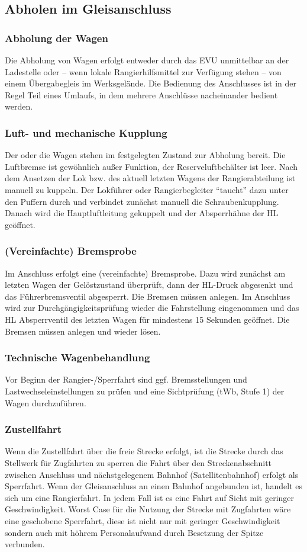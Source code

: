 \subsection{Abholen im Gleisanschluss}
\subsubsection{Abholung der Wagen}
Die Abholung von Wagen erfolgt entweder durch das EVU unmittelbar an der Ladestelle oder -- wenn lokale Rangierhilfsmittel zur Verfügung stehen -- von einem Übergabegleis im Werksgelände. Die Bedienung des Anschlusses ist in der Regel Teil eines Umlaufs, in dem mehrere Anschlüsse nacheinander bedient werden.
\subsubsection{Luft- und mechanische Kupplung}\label{sec:LuftumechKup}
Der oder die Wagen stehen im festgelegten Zustand zur Abholung bereit. Die Luftbremse ist gewöhnlich außer Funktion, der Reserveluftbehälter ist leer. Nach dem Ansetzen der Lok bzw. des aktuell letzten Wagens der Rangierabteilung ist manuell zu kuppeln. Der Lokführer oder Rangierbegleiter "`taucht"' dazu unter den Puffern durch und verbindet zunächst manuell die Schraubenkupplung. Danach wird die Hauptluftleitung gekuppelt und der Absperrhähne der HL geöffnet. %
\subsubsection{(Vereinfachte) Bremsprobe}\label{sec:vBremsprobe}
Im Anschluss erfolgt eine (vereinfachte) Bremsprobe. Dazu wird zunächst am letzten Wagen der Gelöstzustand überprüft, dann der HL-Druck abgesenkt und das Führerbremsventil abgesperrt. Die Bremsen müssen anlegen. Im Anschluss wird zur Durchgängigkeitsprüfung wieder die Fahrstellung eingenommen und das HL Absperrventil des letzten Wagen für mindestens 15 Sekunden geöffnet. Die Bremsen müssen anlegen und wieder lösen.
\subsubsection{Technische Wagenbehandlung}\label{sec:tWb}
Vor Beginn der Rangier-/Sperrfahrt sind ggf. Bremsstellungen %
und Lastwechseleinstellungen zu prüfen und eine Sichtprüfung (tWb, Stufe 1) der Wagen durchzuführen. 
\subsubsection{Zustellfahrt}\label{sec:Zustellfahrt}
Wenn die Zustellfahrt über die freie Strecke erfolgt, ist die Strecke durch das Stellwerk für Zugfahrten zu sperren die Fahrt über den Streckenabschnitt zwischen Anschluss und nächstgelegenem Bahnhof (Satellitenbahnhof) erfolgt als Sperrfahrt. Wenn der Gleisanschluss an einen Bahnhof angebunden ist, handelt es sich um eine Rangierfahrt. In jedem Fall ist es eine Fahrt auf Sicht mit geringer Geschwindigkeit. Worst Case für die Nutzung der Strecke mit Zugfahrten wäre eine geschobene Sperrfahrt, diese ist nicht nur mit geringer Geschwindigkeit sondern auch mit höhrem Personalaufwand durch Besetzung der Spitze verbunden.

